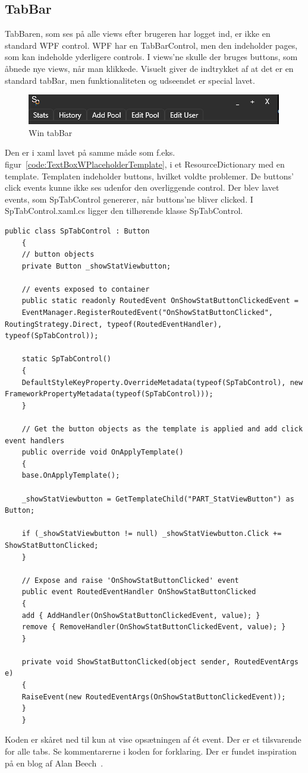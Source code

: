 \subsection{TabBar}
TabBaren, som ses på alle views efter brugeren har logget ind, er ikke en standard WPF control. WPF har en TabBarControl, men den indeholder pages, som kan indeholde yderligere controls. I views'ne skulle der bruges buttons, som åbnede nye views, når man klikkede. Visuelt giver de indtrykket af at det er en standard tabBar, men funktionaliteten og udseendet er special lavet.
\begin{figure}
\centering
\includegraphics[width=0.7\linewidth]{figs/implementering/tabbar}
\caption{Win tabBar}
\label{fig:tabbar}
\end{figure}
Den er i xaml lavet på samme måde som f.eks. figur~\ref{code:TextBoxWPlaceholderTemplate}, i et ResourceDictionary med en template. 
Templaten indeholder buttons, hvilket voldte problemer. De buttons' click events kunne ikke ses udenfor den overliggende control. Der blev lavet events, som SpTabControl genererer, når buttons'ne bliver clicked.
I SpTabControl.xaml.cs ligger den tilhørende klasse SpTabControl.
\begin{lstlisting}[caption=SpTabControl, label=SpTabControl]
	public class SpTabControl : Button
	{
	// button objects
	private Button _showStatViewbutton;
	
	// events exposed to container
	public static readonly RoutedEvent OnShowStatButtonClickedEvent =
	EventManager.RegisterRoutedEvent("OnShowStatButtonClicked", RoutingStrategy.Direct, typeof(RoutedEventHandler), typeof(SpTabControl));
		
	static SpTabControl()
	{
	DefaultStyleKeyProperty.OverrideMetadata(typeof(SpTabControl), new FrameworkPropertyMetadata(typeof(SpTabControl)));
	}
	
	// Get the button objects as the template is applied and add click event handlers
	public override void OnApplyTemplate()
	{
	base.OnApplyTemplate();
	
	_showStatViewbutton = GetTemplateChild("PART_StatViewButton") as Button;
		
	if (_showStatViewbutton != null) _showStatViewbutton.Click += ShowStatButtonClicked;
	}
	
	// Expose and raise 'OnShowStatButtonClicked' event
	public event RoutedEventHandler OnShowStatButtonClicked
	{
	add { AddHandler(OnShowStatButtonClickedEvent, value); }
	remove { RemoveHandler(OnShowStatButtonClickedEvent, value); }
	}
	
	private void ShowStatButtonClicked(object sender, RoutedEventArgs e)
	{
	RaiseEvent(new RoutedEventArgs(OnShowStatButtonClickedEvent));
	}
	}
\end{lstlisting}

Koden er skåret ned til kun at vise opsætningen af ét event. Der er et tilsvarende for alle tabs. Se kommentarerne i koden for forklaring.
Der er fundet inspiration på en blog af Alan Beech~\cite{alanbeech2011}.
